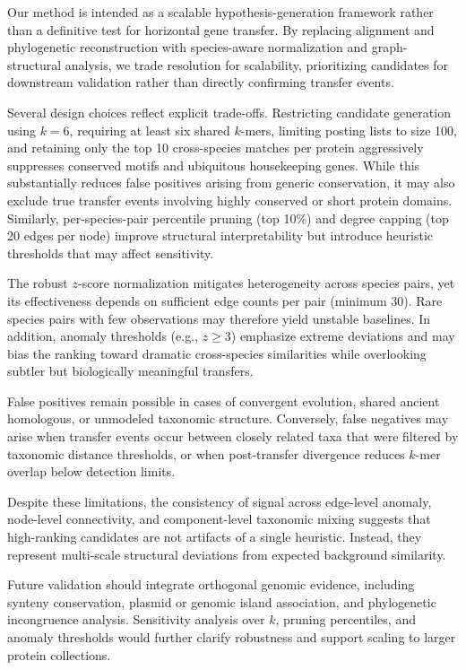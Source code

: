 \documentclass[11pt]{article}
\begin{document}
Our method is intended as a scalable hypothesis-generation framework rather than a definitive test for horizontal gene transfer. By replacing alignment and phylogenetic reconstruction with species-aware normalization and graph-structural analysis, we trade resolution for scalability, prioritizing candidates for downstream validation rather than directly confirming transfer events.

Several design choices reflect explicit trade-offs. Restricting candidate generation using
$k=6$, requiring at least six shared $k$-mers, limiting posting lists to size 100, and retaining
only the top 10 cross-species matches per protein aggressively suppresses conserved motifs and
ubiquitous housekeeping genes. While this substantially reduces false positives arising from
generic conservation, it may also exclude true transfer events involving highly conserved or
short protein domains. Similarly, per-species-pair percentile pruning (top 10\%) and degree
capping (top 20 edges per node) improve structural interpretability but introduce heuristic
thresholds that may affect sensitivity.

The robust $z$-score normalization mitigates heterogeneity across species pairs, yet its
effectiveness depends on sufficient edge counts per pair (minimum 30). Rare species pairs with
few observations may therefore yield unstable baselines. In addition, anomaly thresholds
(e.g., $z \ge 3$) emphasize extreme deviations and may bias the ranking toward dramatic
cross-species similarities while overlooking subtler but biologically meaningful transfers.

False positives remain possible in cases of convergent evolution, shared ancient homologous, or
unmodeled taxonomic structure. Conversely, false negatives may arise when transfer events occur
between closely related taxa that were filtered by taxonomic distance thresholds, or when
post-transfer divergence reduces $k$-mer overlap below detection limits.

Despite these limitations, the consistency of signal across edge-level anomaly, node-level
connectivity, and component-level taxonomic mixing suggests that high-ranking candidates are
not artifacts of a single heuristic. Instead, they represent multi-scale structural deviations from
expected background similarity.

Future validation should integrate orthogonal genomic evidence, including synteny conservation,
plasmid or genomic island association, and phylogenetic incongruence analysis. Sensitivity
analysis over $k$, pruning percentiles, and anomaly thresholds would further clarify robustness
and support scaling to larger protein collections.
\end{document}
